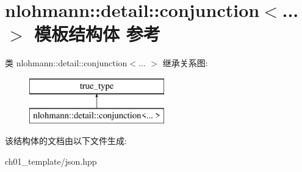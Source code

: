 \hypertarget{structnlohmann_1_1detail_1_1conjunction}{}\section{nlohmann\+::detail\+::conjunction$<$... $>$ 模板结构体 参考}
\label{structnlohmann_1_1detail_1_1conjunction}
类 nlohmann\+::detail\+::conjunction$<$... $>$ 继承关系图\+:\begin{figure}[H]
\begin{center}
\leavevmode
\includegraphics[height=2.000000cm]{structnlohmann_1_1detail_1_1conjunction}
\end{center}
\end{figure}


该结构体的文档由以下文件生成\+:\begin{DoxyCompactItemize}
\item 
ch01\+\_\+template/json.\+hpp\end{DoxyCompactItemize}
